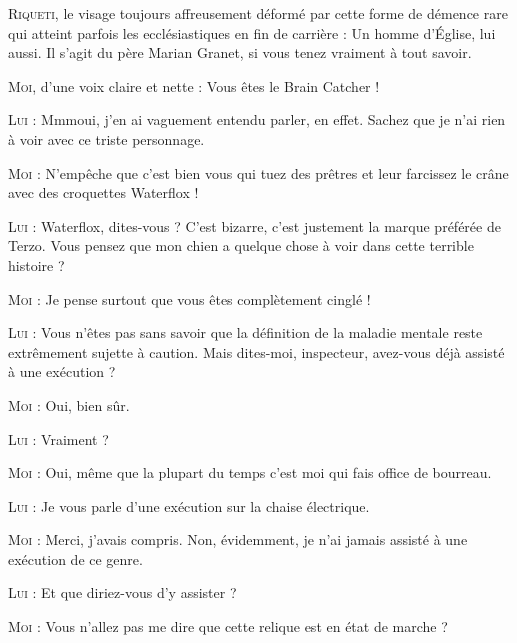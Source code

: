 \textsc{Riqueti}, le visage toujours affreusement déformé par cette forme de démence rare qui atteint parfois les ecclésiastiques en fin de carrière : Un homme d’Église, lui aussi. Il s’agit du père Marian Granet, si vous tenez vraiment à tout savoir.

\textsc{Moi}, d’une voix claire et nette : Vous êtes le Brain Catcher !

\textsc{Lui} : Mmmoui, j’en ai vaguement entendu parler, en effet. Sachez que je n’ai rien à voir avec ce triste personnage.

\textsc{Moi} : N’empêche que c’est bien vous qui tuez des prêtres et leur farcissez le crâne avec des croquettes Waterflox !

\textsc{Lui} : Waterflox, dites-vous ? C’est bizarre, c’est justement la marque préférée de Terzo. Vous pensez que mon chien a quelque chose à voir dans cette terrible histoire ?

\textsc{Moi} : Je pense surtout que vous êtes complètement cinglé !

\textsc{Lui} : Vous n’êtes pas sans savoir que la définition de la maladie mentale reste extrêmement sujette à caution. Mais dites-moi, inspecteur, avez-vous déjà assisté à une exécution ?

\textsc{Moi} : Oui, bien sûr.

\textsc{Lui} : Vraiment ?

\textsc{Moi} : Oui, même que la plupart du temps c’est moi qui fais office de bourreau.

\textsc{Lui} : Je vous parle d’une exécution sur la chaise électrique.

\textsc{Moi} : Merci, j’avais compris. Non, évidemment, je n’ai jamais assisté à une exécution de ce genre.

\textsc{Lui} : Et que diriez-vous d’y assister ?

\textsc{Moi} : Vous n’allez pas me dire que cette relique est en état de marche ?

